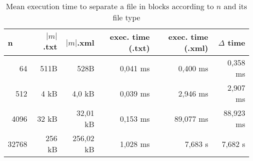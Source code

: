\begin{table}[ht]
\centering
\begin{tabular}{rrrrrr}
\hline
\multicolumn{1}{l}{\textbf{n}} &
\textbf{$|m|$.txt} &
\textbf{$|m|$.xml} &
\textbf{exec. time (.txt)} &
\textbf{exec. time (.xml)} &
\textbf{$\Delta$ time} \\ \hline
64                               & 511B              & 528B              & 0,041 ms                   & 0,400 ms                   & 0,358 ms         \\
512                              & 4 kB              & 4,0 kB            & 0,039 ms                   & 2,946 ms                   & 2,907 ms         \\
4096                             & 32 kB             & 32,01 kB          & 0,153 ms                   & 89,077 ms                  & 88,923 ms        \\
32768                            & 256 kB            & 256,02 kB         & 1,028 ms                   & 7,683 s                    & 7,682 s          \\
\end{tabular}
    \caption{Mean execution time to separate a file in blocks according to $n$ and its file type}
    \label{table:document-type-execution-time}
\end{table}